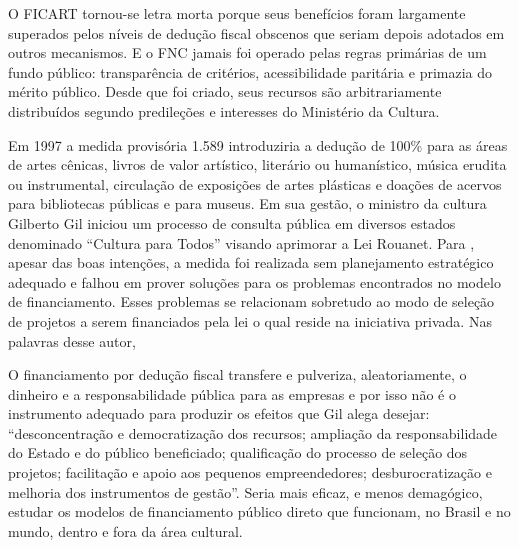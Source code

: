 \documentclass[a4paper, 12pt, openright, oneside, german, french, english, brazil]{abntex2}
\begin{document}
	\begin{citacao}
		O FICART tornou-se letra morta porque seus benefícios foram largamente superados pelos níveis de
		dedução fiscal obscenos que seriam depois adotados em outros mecanismos. E o FNC jamais foi operado pelas regras primárias de um fundo público: transparência de critérios, acessibilidade paritária e primazia do mérito público. Desde que foi criado, seus recursos são arbitrariamente
		distribuídos segundo predileções e interesses do Ministério da Cultura. \cite[p. 22-3]{sarkovas2005incentivo}
	\end{citacao}
	
	Em 1997 a medida provisória 1.589 introduziria a dedução de 100\% para as áreas de artes cênicas,
	livros de valor artístico, literário ou humanístico, música erudita ou instrumental, circulação de
	exposições de artes plásticas e doações de acervos para bibliotecas públicas e para museus. Em sua gestão, o ministro da cultura Gilberto Gil iniciou um processo de consulta pública em diversos estados denominado ``Cultura para Todos'' visando aprimorar a Lei Rouanet. Para , apesar das boas intenções, a medida foi realizada sem planejamento estratégico adequado e falhou em prover soluções para os problemas encontrados no modelo de financiamento. Esses problemas se relacionam sobretudo ao modo de seleção de projetos a serem financiados pela lei o qual reside na iniciativa privada. Nas palavras desse autor, 
	
	\begin{citacao}
		O financiamento por dedução fiscal transfere e pulveriza, aleatoriamente, o dinheiro e a responsabilidade pública para as empresas e por	isso não é o instrumento adequado para produzir os efeitos que Gil alega desejar: ``desconcentração e democratização dos
		recursos; ampliação da responsabilidade do Estado e do público beneficiado; qualificação do processo de seleção dos projetos; facilitação e	apoio aos pequenos empreendedores; desburocratização e melhoria dos instrumentos de gestão”. Seria mais eficaz, e menos demagógico, estudar os modelos de financiamento público	direto que funcionam, no Brasil e no mundo,	dentro e fora da área cultural. \cite[p. 25]{sarkovas2005incentivo}
	\end{citacao}
	
\end{document}
